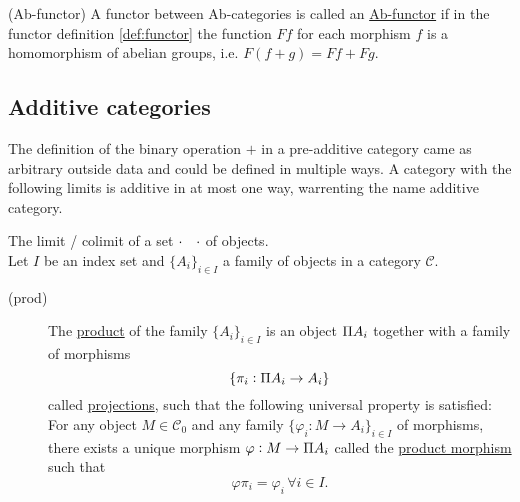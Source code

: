 \begin{definition}{(Ab-functor)}
A functor between Ab-categories is called an \ul{Ab-functor} if in the functor definition \ref{def:functor} the function $Ff$ for each
morphism $f$ is a homomorphism of abelian groups, i.e. $F(f+g) = Ff + Fg$.
\end{definition}

\subsection{Additive categories}
The definition of the binary operation $+$ in a pre-additive category came as arbitrary outside data and could be defined
in multiple ways. A category with the following limits is additive in at most one way, warrenting the name additive category.

\begin{definition}\label{def:prod_coprod}
The limit / colimit of a set $\cdot \text{\phantom{$\rightarrow$}} \cdot$ of objects.\\
Let $I$ be an index set and $\{A_{i}\}_{i\in I}$ a family of objects in a category $\mathcal{C}$.
\begin{description}
\item[(prod)] The \ul{product} of the family $\{A_{i}\}_{i\in I}$ is an object $\invamalg A_{i}$ together with a family of morphisms
\[
\{ \pi_{i} : \invamalg A_{i} \rightarrow A_{i} \}
\]
called \ul{projections}, such that the following universal property is satisfied:\\
For any object $M \in \mathcal{C}_{0}$ and any family $\{ \varphi_{i} : M \rightarrow A_{i} \}_{i\in I}$ of morphisms, there exists
a unique morphism $\varphi : M \rightarrow \invamalg A_{i}$ called the \ul{product morphism} such that
\[
\varphi \pi_{i} = \varphi_{i} \, \forall i \in I.
\]
\end{description}
\end{definition}
